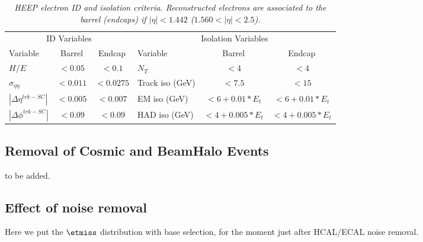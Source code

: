 \begin{table}[htbp]
 \label{tab:HEEPselection}
 \begin{center}
   \begin{tabular}{|lcc|lcc|} \hline
     \multicolumn{3}{|c|}{ID Variables} & \multicolumn{3}{|c|}{Isolation Variables} \\
     Variable & Barrel & Endcap & Variable & Barrel & Endcap  \\ \hline
     $H/E$  & $<0.05$ & $<0.1$ & $N_T$  & $<4$ & $<4$ \\ \hline
     $\sigma_{\eta\eta}$  & $<0.011$ & $<0.0275$ & Track iso (GeV) & $<7.5$ & $<15$ \\ \hline
     $|\Delta\eta^{trk-SC}|$ & $<0.005$ & $<0.007$ & EM iso (GeV) & $<6+0.01*E_{t}$ & $<6+0.01*E_{t}$ \\ \hline
     $|\Delta\phi^{trk-SC}|$ & $<0.09$ & $<0.09$ & HAD iso (GeV) & $<4+0.005*E_{t}$ & $<4+0.005*E_{t}$ \\ \hline
   \end{tabular}
 \caption{\small \sl HEEP electron ID and isolation criteria.
   Reconstructed electrons are associated to the
   barrel (endcaps) if $|\eta|<1.442$ ($1.560<|\eta|<2.5$).}
 \end{center}
\end{table}

\subsection{Removal of Cosmic and BeamHalo Events}
to be added.

\subsection{Effect of noise removal}
Here we put the $\etmiss$ distribution with base selection, for the moment just 
after HCAL/ECAL noise removal.

\clearpage

